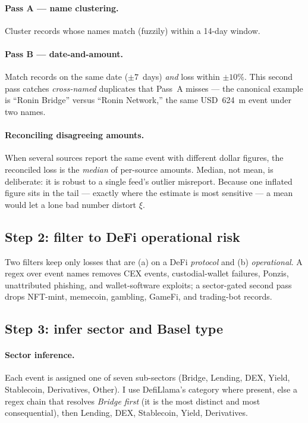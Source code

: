 \documentclass[11pt]{article}
\theoremstyle{definition}
\theoremstyle{remark}
\theoremstyle{definition}
\newcommand{\1}{\mathbf{1}}
\begin{document}
\paragraph{Pass A --- name clustering.}
Cluster records whose names match (fuzzily) within a 14-day window.

\paragraph{Pass B --- date-and-amount.}
Match records on the same date ($\pm 7$~days) \emph{and} loss within $\pm 10\%$.
This second pass catches \emph{cross-named} duplicates that Pass~A misses ---
the canonical example is ``Ronin Bridge'' versus ``Ronin Network,'' the same
USD~624~m event under two names.

\paragraph{Reconciling disagreeing amounts.}
When several sources report the same event with different dollar figures, the
reconciled loss is the \emph{median} of per-source amounts. Median, not mean,
is deliberate: it is robust to a single feed's outlier misreport. Because one
inflated figure sits in the tail --- exactly where the estimate is most
sensitive --- a mean would let a lone bad number distort $\xi$.

\subsection{Step 2: filter to DeFi operational risk}

Two filters keep only losses that are (a) on a DeFi \emph{protocol} and (b)
\emph{operational}. A regex over event names removes CEX events,
custodial-wallet failures, Ponzis, unattributed phishing, and wallet-software
exploits; a sector-gated second pass drops NFT-mint, memecoin, gambling,
GameFi, and trading-bot records.

\subsection{Step 3: infer sector and Basel type}

\paragraph{Sector inference.}
Each event is assigned one of seven sub-sectors (Bridge, Lending, DEX, Yield,
Stablecoin, Derivatives, Other). I use DefiLlama's category where present,
else a regex chain that resolves \emph{Bridge first} (it is the most distinct
and most consequential), then Lending, DEX, Stablecoin, Yield, Derivatives.
\end{document}
